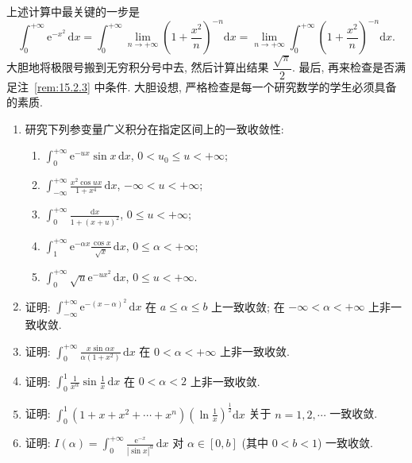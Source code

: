 \begin{remark}\label{rem:15.2.4}
上述计算中最关键的一步是
\[
  \int_{0}^{+\infty}\mathrm{e}^{-x^{2}}\,\mathrm{d}x=\int_{0}^{+\infty}\lim_{n\to+\infty}\left(1+\frac{x^{2}}{n}\right)^{-n}\mathrm{d}x=\lim_{n\to+\infty}\int_{0}^{+\infty}\left(1+\frac{x^{2}}{n}\right)^{-n}\mathrm{d}x.
\]
大胆地将极限号搬到无穷积分号中去, 然后计算出结果 $\dfrac{\sqrt{\pi}}{2}$. 最后, 再来检查是否满足注~\ref{rem:15.2.3} 中条件. 大胆设想, 严格检查是每一个研究数学的学生必须具备的素质.
\end{remark}

\begin{exblock}[练习题 15.2]
\begin{enumerate}
  \item 研究下列参变量广义积分在指定区间上的一致收敛性:
  \begin{enumerate}
    \item $\displaystyle\int_{0}^{+\infty}\mathrm{e}^{-ux}\sin x\,\mathrm{d}x$, $0<u_{0}\leqslant u<+\infty$;
    \item $\displaystyle\int_{-\infty}^{+\infty}\frac{x^{2}\cos ux}{1+x^{4}}\,\mathrm{d}x$, $-\infty<u<+\infty$;
    \item $\displaystyle\int_{0}^{+\infty}\frac{\mathrm{d}x}{1+(x+u)^{2}}$, $0\leqslant u<+\infty$;
    \item $\displaystyle\int_{1}^{+\infty}\mathrm{e}^{-\alpha x}\frac{\cos x}{\sqrt{x}}\,\mathrm{d}x$, $0\leqslant\alpha<+\infty$;
    \item $\displaystyle\int_{0}^{+\infty}\sqrt{u}\mathrm{e}^{-ux^{2}}\,\mathrm{d}x$, $0\leqslant u<+\infty$.
  \end{enumerate}
  \item 证明: $\displaystyle\int_{-\infty}^{+\infty}\mathrm{e}^{-(x-\alpha)^{2}}\,\mathrm{d}x$ 在 $a\leqslant\alpha\leqslant b$ 上一致收敛; 在 $-\infty<\alpha<+\infty$ 上非一致收敛.
  \item 证明: $\displaystyle\int_{0}^{+\infty}\frac{x\sin\alpha x}{\alpha(1+x^{2})}\,\mathrm{d}x$ 在 $0<\alpha<+\infty$ 上非一致收敛.
  \item 证明: $\displaystyle\int_{0}^{1}\frac{1}{x^{\alpha}}\sin\frac{1}{x}\,\mathrm{d}x$ 在 $0<\alpha<2$ 上非一致收敛.
  \item 证明: $\displaystyle\int_{0}^{1}(1+x+x^{2}+\cdots+x^{n})\left(\ln\frac{1}{x}\right)^{\frac{1}{2}}\mathrm{d}x$ 关于 $n=1,2,\cdots$ 一致收敛.
  \item 证明: $I(\alpha)=\displaystyle\int_{0}^{+\infty}\frac{\mathrm{e}^{-x}}{|\sin x|^{\alpha}}\,\mathrm{d}x$ 对 $\alpha\in[0,b]$ (其中 $0<b<1$) 一致收敛.

\end{enumerate}
\end{exblock}
